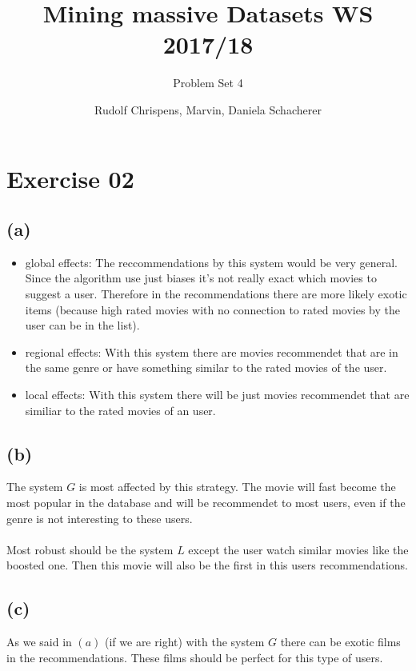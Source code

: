 \documentclass[11pt,a4paper]{scrartcl}
\title{Mining massive Datasets WS 2017/18}
\subtitle{Problem Set 4}
\author{Rudolf Chrispens, Marvin, Daniela Schacherer}
\begin{document}
\maketitle

\section*{Exercise 02}

\subsection*{(a)}

\begin{itemize}
\item global effects: The reccommendations by this system would be very general. Since the algorithm use just biases it's not really exact which movies to suggest a user. Therefore in the recommendations there are more likely exotic items (because high rated movies with no connection to rated movies by the user can be in the list).
\item regional effects: With this system there are movies recommendet that are in the same genre or have something similar to the rated movies of the user.
\item local effects: With this system there will be just movies recommendet that are similiar to the rated movies of an user.
\end{itemize}

\subsection*{(b)}

The system $G$ is most affected by this strategy. The movie will fast become the most popular in the database and will be recommendet to most users, even if the genre is not interesting to these users.\\\\
Most robust should be the system $L$ except the user watch similar movies like the boosted one. Then this movie will also be the first in this users recommendations.

\subsection*{(c)}

As we said in $(a)$ (if we are right) with the system $G$ there can be exotic films in the recommendations. These films should be perfect for this type of users.
\end{document}
